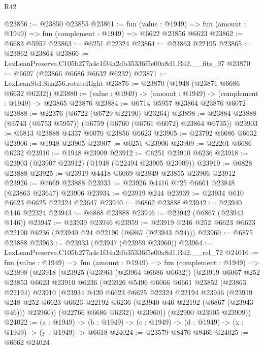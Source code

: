 \begin{lexlean}{R42}
\begin{coremodule}
{@23856 := @23850 @23855
@23861 := fun (value : @1949) =>
  fun (amount : @1949) => fun (complement : @1949) => @6622 @23856 @6623
@23862 := @6683 @5957
@23863 := @6251 @22324
@23864 := @23863 @22195
@23865 := @23862 @23864
@23866 := LexLeanPreserve.C105b277a4c1f34a2db35336f5e00a8d1.R42.__fits_97
@23870 := @6697 (@23866 @6686 @6632 @6232)
@23871 := LexLeanStd.Sha256.rotateRight
@23876 := @23870 (@1948 (@23871 @6686 @6632 @6232))
@23880 := (value : @1949) -> (amount : @1949) -> (complement : @1949) -> @23865 @23876
@23884 := @6714 @5957 @23864 @23876 @6072
@23888 := @22376 (@6722 (@6729 @22190) @23264)
@23898 := @23884 @23888 (@6743 (@6753 @5957)) (@6759 (@6760 (@6761 @6072) @23864 @6735))
@23903 := @6813 @23888 @4337 @6070 @23856 @6623
@23905 := @23792 @6686 @6632
@23906 := @1948 @23905
@23907 := @6251 @23906
@23909 := @22201 @6686 @6232
@23910 := @1948 @23909
@23912 := @6251 @23910 @6236
@23918 := @23903 (@23907 @23912) (@1948 (@22494 @23905 @23909))
@23919 := @6828 @23888
@23925 := @23919 @4418 @6069 @23849 @23855 @23906 @23912
@23926 := @7669 @23888
@23933 := @23926 @4416 @725 @6661 @23848 (@23863 @23647) @23906
@23934 := @23919 @244
@23939 := @23934 @610 @6623 @6625 @22324 @23647
@23940 := @6862 @23888
@23942 := @23940 @146 @22324
@23943 := @6868 @23888
@23946 := @23942 (@6867 (@23943 @146))
@23947 := @23939 @23946
@23959 := @23919 @246 @252 @6623 @6623 @22190 @6236 (@23940 @24 @22190 (@6867 (@23943 @24)))
@23960 := @6875 @23888
@23963 := @23933 (@23947 (@23959 @23960))
@23964 := LexLeanPreserve.C105b277a4c1f34a2db35336f5e00a8d1.R42.__rel_72
@24016 := fun (value : @1949) =>
  fun (amount : @1949) =>
  fun (complement : @1949) =>
  @23898
    (@23918
      (@23925
        (@23963 (@23964 @6686 @6632))
        (@23919
          @6067
          @252
          @23853
          @6623
          @23910
          @6236
          (@23926
            @5496
            @6066
            @6661
            @23852
            (@23863 @22194)
            @23910
            (@23934
              @420
              @6623
              @6625
              @22324
              @22194
              @23946
              (@23919
                @248
                @252
                @6623
                @6623
                @22192
                @6236
                (@23940 @46 @22192 (@6867 (@23943 @46)))
                @23960))
            (@22766 @6686 @6232))
          @23960))
      (@22900 @23905 @23909))
@24022 := (a : @1949) ->
  (b : @1949) -> (c : @1949) -> (d : @1949) -> (x : @1949) -> (y : @1949) -> @6618
@24024 := @23579 @8470 @8466
@24025 := @6662 @24024
}
\end{coremodule}
\end{lexlean}
